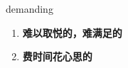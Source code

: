 
\begin{frame}
{\huge demanding}
\begin{center}
\begin{enumerate}\Large
  \item \textbf{难以取悦的，难满足的}
  \item \textbf{费时间花心思的}
\end{enumerate}
\end{center}
\end{frame}
